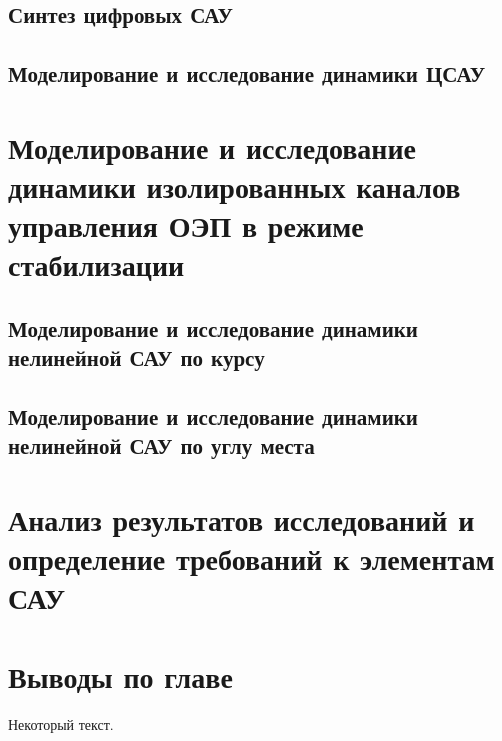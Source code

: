 \subsection{Синтез цифровых САУ } \label{subsec:ch4/sect4/sub3}


\subsection{Моделирование и исследование динамики ЦСАУ} \label{subsec:ch4/sect4/sub4}










\section{Моделирование и исследование динамики изолированных каналов управления ОЭП в режиме стабилизации} \label{ch:ch4/sect6}


\subsection{Моделирование и исследование динамики нелинейной САУ по курсу} \label{subsec:ch4/sect6/sub1}


\subsection{Моделирование и исследование динамики нелинейной САУ по углу места} \label{subsec:ch4/sect6/sub2}


\section{Анализ результатов исследований и определение требований к элементам САУ} \label{ch:ch4/sect7}


\section{Выводы по главе} \label{ch:ch4/sect8}



Некоторый текст.

\clearpage